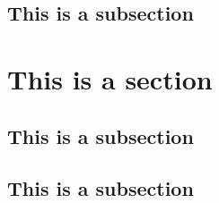 \documentclass[11pt,oneside]{book}
\begin{document}
\subsection{This is a subsection}
\lipsum[1-2]

\section{This is a section}
\subsection{This is a subsection}
\lipsum[1-1]
\subsection{This is a subsection}
\lipsum[1-2]
\end{document}
